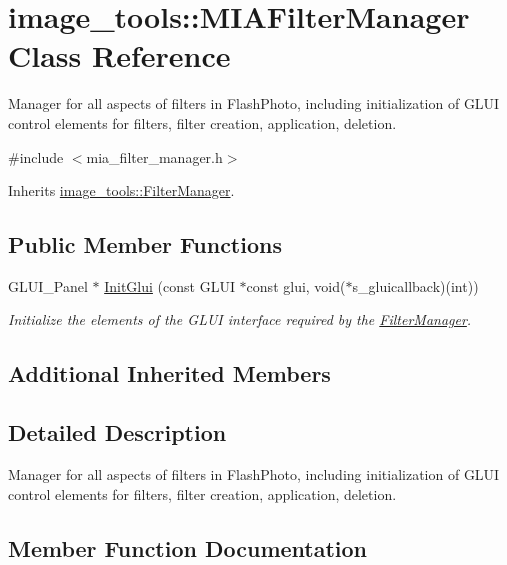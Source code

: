 \hypertarget{classimage__tools_1_1MIAFilterManager}{}\section{image\+\_\+tools\+:\+:M\+I\+A\+Filter\+Manager Class Reference}
\label{classimage__tools_1_1MIAFilterManager}


Manager for all aspects of filters in Flash\+Photo, including initialization of G\+L\+UI control elements for filters, filter creation, application, deletion.  




{\ttfamily \#include $<$mia\+\_\+filter\+\_\+manager.\+h$>$}



Inherits \hyperlink{classimage__tools_1_1FilterManager}{image\+\_\+tools\+::\+Filter\+Manager}.

\subsection*{Public Member Functions}
\begin{DoxyCompactItemize}
\item 
G\+L\+U\+I\+\_\+\+Panel $\ast$ \hyperlink{classimage__tools_1_1MIAFilterManager_a9edb4c699c3349d444e59bdff820f731}{Init\+Glui} (const G\+L\+UI $\ast$const glui, void($\ast$s\+\_\+gluicallback)(int))
\begin{DoxyCompactList}\small\item\em Initialize the elements of the G\+L\+UI interface required by the \hyperlink{classimage__tools_1_1FilterManager}{Filter\+Manager}. \end{DoxyCompactList}\end{DoxyCompactItemize}
\subsection*{Additional Inherited Members}


\subsection{Detailed Description}
Manager for all aspects of filters in Flash\+Photo, including initialization of G\+L\+UI control elements for filters, filter creation, application, deletion. 

\subsection{Member Function Documentation}
